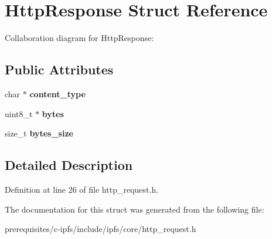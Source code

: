 \hypertarget{struct_http_response}{}\section{Http\+Response Struct Reference}
\label{struct_http_response}


Collaboration diagram for Http\+Response\+:
\subsection*{Public Attributes}
\begin{DoxyCompactItemize}
\item 
\mbox{\label{struct_http_response_a3cff9186d94bb2347f7b0dab1e2ef546}} 
char $\ast$ {\bfseries content\+\_\+type}
\item 
\mbox{\label{struct_http_response_a218aa5ccbed65767026812768442d3c6}} 
uint8\+\_\+t $\ast$ {\bfseries bytes}
\item 
\mbox{\label{struct_http_response_a999d8eef06f7b3a3eef0ca7dabfda2f9}} 
size\+\_\+t {\bfseries bytes\+\_\+size}
\end{DoxyCompactItemize}


\subsection{Detailed Description}


Definition at line 26 of file http\+\_\+request.\+h.



The documentation for this struct was generated from the following file\+:\begin{DoxyCompactItemize}
\item 
prerequisites/c-\/ipfs/include/ipfs/core/http\+\_\+request.\+h\end{DoxyCompactItemize}
